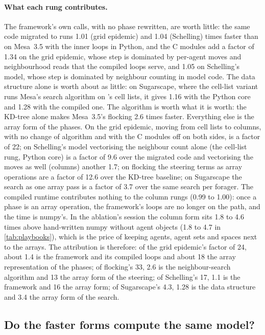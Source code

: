 \paragraph{What each rung contributes.} The framework's own calls, with no phase rewritten,
are worth little: the same code migrated to \modelly{} runs 1.01 (grid epidemic) and 1.04 (Schelling) times faster than on
Mesa~3.5 with the inner loops in Python, and the C
modules add a factor of 1.34 on the grid epidemic, whose step is dominated by per-agent
moves and neighbourhood reads that the compiled loops serve, and 1.05 on Schelling's model,
whose step is dominated by neighbour counting in model code. The data structure alone is
worth about as little: on Sugarscape, where the cell-list variant runs Mesa's search
algorithm on \modelly{}'s cell lists, it gives 1.16 with the Python core and 1.28 with the
compiled one. The algorithm is worth what it is worth: the KD-tree alone makes Mesa~3.5's
flocking 2.6 times faster. Everything else is the array form of the phases. On the grid
epidemic, moving from cell lists to columns, with no change of algorithm and with the C
modules off on both sides, is a factor of 22; on Schelling's model vectorising the
neighbour count alone (the cell-list rung, Python core) is a factor of 9.6 over the migrated
code and vectorising the moves as well (columns) another 1.7; on flocking the steering
terms as array operations are a factor of 12.6 over the KD-tree baseline; on Sugarscape
the search as one array pass is a factor of 3.7 over the same search per forager. The
compiled runtime contributes nothing to the column rungs (0.99 to 1.00): once a phase is an
array operation, the framework's loops are no longer on the path, and the time is numpy's.
In the ablation's session the column form sits 1.8 to 4.6 times above hand-written numpy
without agent objects (1.8 to 4.7 in \cref{tab:playbooks}),
which is the price of keeping agents, agent sets and spaces next to the arrays.
The attribution is therefore: of the grid epidemic's factor of 24, about 1.4 is the
framework and its compiled loops and about 18 the array representation of the phases; of
flocking's 33, 2.6 is the neighbour-search algorithm and 13 the array form of the
steering; of Schelling's 17, 1.1 is the framework and 16 the array form; of Sugarscape's
4.3, 1.28 is the data structure and 3.4 the array form of the search.

\subsection{Do the faster forms compute the same model?}
\label{sec:agreement}

